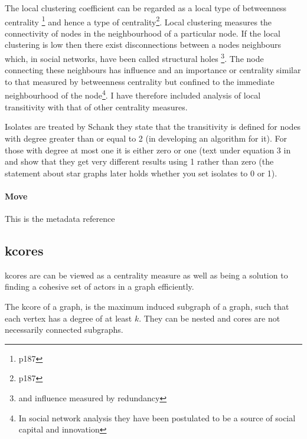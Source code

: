 The local clustering coefficient can be regarded as a local type of betweenness centrality \cite{newman2018networks}\footnote{p187}  and hence a type of centrality\cite{newman2018networks}\footnote{p187}. Local clustering measures the connectivity of nodes in the neighbourhood of a particular node. If the local clustering is low then there exist disconnections between a nodes neighbours which, in social networks, have been called structural holes \cite{burt2009structural}\footnote{and influence measured by redundancy}. The node connecting these neighbours has influence and an importance or centrality similar to that measured by betweenness centrality but confined to the immediate neighbourhood of the node\footnote{In social network analysis they have been postulated to be a source of social capital and innovation}. I have therefore included analysis of local transitivity with that of other centrality measures. 


Isolates are treated by Schank\cite{schank2005approximating} they state that the transitivity is defined for nodes with degree greater than or equal to 2 (in developing an algorithm for it). For those with degree at most one it is either zero or one (text under equation 3 in \cite{schank2005approximating} and show that they get very different results using 1 rather than zero (the statement about star graphs later holds whether you set isolates to 0 or 1). 
\paragraph{Move}
This is the metadata reference \cite{newman2016structure}

\subsection{kcores}

kcores are can be viewed as a centrality measure as well as being a solution to finding a cohesive set of actors in a graph efficiently.

The kcore of a graph, is the maximum induced subgraph of a graph, such that each vertex has a degree of at least $k$. They can be nested and cores are not necessarily connected subgraphs\cite{batagelj2003m}. 

